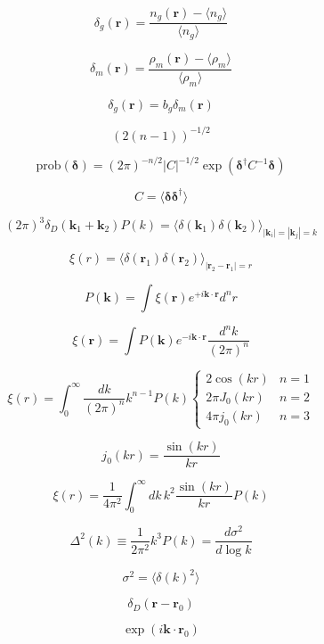 \documentclass[12pt]{article}
\providecommand{\vecsymbol}[1]{\ensuremath{\boldsymbol{#1}}}
\providecommand{\rv}{\vecsymbol{r}}
\providecommand{\kv}{\vecsymbol{k}}
\providecommand{\delv}{\vecsymbol{\delta}}
\begin{document}
$$
\delta_g(\rv) = \frac{n_g(\rv) - \langle n_g\rangle}{\langle n_g\rangle}
$$

$$
\delta_m(\rv) = \frac{\rho_m(\rv) - \langle \rho_m\rangle}{\langle \rho_m\rangle}
$$

$$
\delta_g(\rv) = b_g \delta_m(\rv)
$$

$$
\left( 2(n-1) \right)^{-1/2}
$$

$$
\text{prob}(\delv) = (2\pi)^{-n/2} |C|^{-1/2} \exp\left(
\delv^\dagger C^{-1} \delv \right)
$$

$$
C = \langle \delv \delv^\dagger \rangle
$$

$$
(2\pi)^3 \delta_D(\kv_1 + \kv_2) P(k) = \langle \delta(\kv_1)\delta(\kv_2) \rangle_{|\kv_i|=|\kv_j|=k}
$$

$$
\xi(r) = \langle \delta(\rv_1)\delta(\rv_2)\rangle_{|\rv_2-\rv_1|=r}
$$

$$
P(\kv) = \int \xi(\rv) e^{+ i \kv\cdot\rv} d^n r
$$

$$
\xi(\rv) = \int P(\kv) e^{- i \kv\cdot\rv} \frac{d^n k}{(2\pi)^n}
$$

$$
\xi(r) = \int_0^\infty \frac{dk}{(2\pi)^n} k^{n-1} P(k) \begin{cases}
2 \cos(k r) & n = 1 \\
2\pi J_0(k r) & n = 2 \\
4\pi j_0(k r) & n = 3
\end{cases}
$$

$$
j_0(k r) = \frac{\sin(k r)}{k r}
$$

$$
\xi(r) = \frac{1}{4\pi^2} \int_0^\infty dk\,k^2 \frac{\sin(k r)}{k r} P(k)
$$

$$
\Delta^2(k) \equiv \frac{1}{2\pi^2} k^3 P(k) = \frac{d\sigma^2}{d\log k}
$$

$$
\sigma^2 = \langle \delta(k)^2 \rangle
$$

$$
\delta_D(\rv - \rv_0)
$$

$$
\exp(i \kv\cdot\rv_0)
$$


\end{document}

